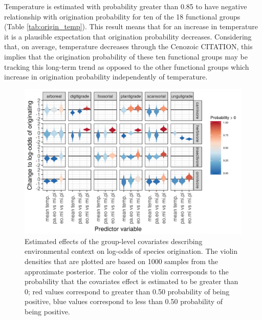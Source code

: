 \documentclass[12pt,letterpaper]{article}
\begin{document}
Temperature is estimated with probability greater than 0.85 to have negative relationship with origination probability for ten of the 18 functional groups (Table \ref{tab:origin_temp}). This result means that for an increase in temperature it is a plausible expectation that origination probability decreases. Considering that, on average, temperature decreases through the Cenozoic CITATION, this implies that the origination probability of these ten functional groups may be tracking this long-term trend as opposed to the other functional groups which increase in origination probability independently of temperature.
\begin{figure}[ht]
  \centering
  \includegraphics[width=\textwidth,height=0.4\textheight,keepaspectratio=true]{figure/group_on_origin_bd}
  \caption{Estimated effects of the group-level covariates describing environmental context on log-odds of species origination. The violin densities that are plotted are based on 1000 samples from the approximate posterior. The color of the violin corresponds to the probability that the covariates effect is estimated to be greater than 0; red values correspond to greater than 0.50 probability of being positive, blue values correspond to less than 0.50 probability of being positive.} 
  \label{fig:group_origin_bd}
\end{figure}
\end{document}
